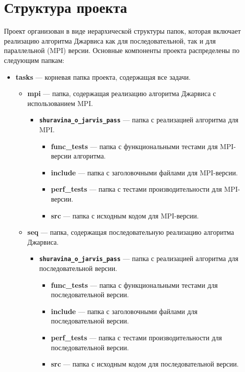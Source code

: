 \documentclass[12pt]{article}
\begin{document}
\section*{Структура проекта}

Проект организован в виде иерархической структуры папок, которая включает реализацию алгоритма Джарвиса как для последовательной, так и для параллельной (MPI) версии. Основные компоненты проекта распределены по следующим папкам:

\begin{itemize}
\item \textbf{tasks} — корневая папка проекта, содержащая все задачи.
\begin{itemize}
\item \textbf{mpi} — папка, содержащая реализацию алгоритма Джарвиса с использованием MPI.
\begin{itemize}
\item \textbf{\texttt{shuravina_o_jarvis_pass}} — папка с реализацией алгоритма для MPI.
\begin{itemize}
\item \textbf{func_tests} — папка с функциональными тестами для MPI-версии алгоритма.
\item \textbf{include} — папка с заголовочными файлами для MPI-версии.
\item \textbf{perf_tests} — папка с тестами производительности для MPI-версии.
\item \textbf{src} — папка с исходным кодом для MPI-версии.
\end{itemize}
\end{itemize}
\item \textbf{seq} — папка, содержащая последовательную реализацию алгоритма Джарвиса.
\begin{itemize}
\item \textbf{\texttt{shuravina_o_jarvis_pass}} — папка с реализацией алгоритма для последовательной версии.
\begin{itemize}
\item \textbf{func_tests} — папка с функциональными тестами для последовательной версии.
\item \textbf{include} — папка с заголовочными файлами для последовательной версии.
\item \textbf{perf_tests} — папка с тестами производительности для последовательной версии.
\item \textbf{src} — папка с исходным кодом для последовательной версии.
\end{itemize}
\end{itemize}
\end{itemize}
\end{itemize}
\end{document}
